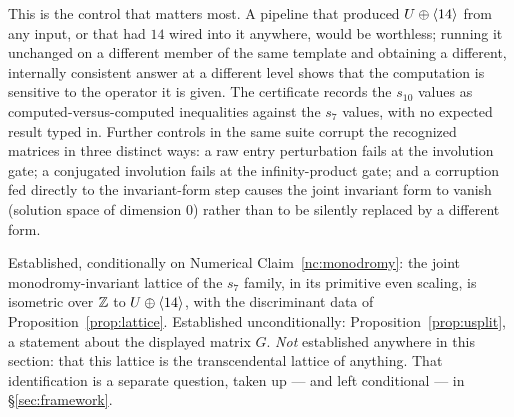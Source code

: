 This is the control that matters most. A pipeline that produced
$U\oplus\langle 14\rangle$ from any input, or that had $14$ wired into it anywhere,
would be worthless; running it unchanged on a different member of the same
template and obtaining a different, internally consistent answer at a
different level shows that the computation is sensitive to the operator it is
given. The certificate records the $s_{10}$ values as computed-versus-computed
inequalities against the $s_7$ values, with no expected result typed in.
Further controls in the same suite corrupt the recognized matrices in three
distinct ways: a raw entry perturbation fails at the involution gate; a
conjugated involution fails at the infinity-product gate; and a corruption fed
directly to the invariant-form step causes the joint invariant form to vanish
(solution space of dimension $0$) rather than to be silently replaced by a
different form.

\begin{remark}
\label{rem:lattice-scope}
Established, conditionally on Numerical Claim~\ref{nc:monodromy}: the joint
monodromy-invariant lattice of the $s_7$ family, in its primitive even
scaling, is isometric over $\mathbb{Z}$ to $U\oplus\langle 14\rangle$, with the discriminant
data of Proposition~\ref{prop:lattice}. Established unconditionally:
Proposition~\ref{prop:usplit}, a statement about the displayed matrix $G$.
\emph{Not} established anywhere in this section: that this lattice is the
transcendental lattice of anything. That identification is a separate question,
taken up --- and left conditional --- in \S\ref{sec:framework}.
\end{remark}

